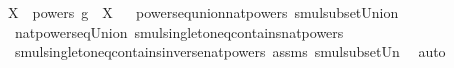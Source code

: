 \begin{isabellebody}
\ \ \ {\isachardoublequoteopen}X\ {\isasymcdots}\ {\isacharparenleft}{\kern0pt}powers\ g{\isacharparenright}{\kern0pt}\ {\isacharequal}{\kern0pt}\ X{\isachardoublequoteclose}%
\isadelimproof
\ %
\endisadelimproof
%
\isatagproof
{}\isamarkupfalse%
\ powers{\isacharunderscore}{\kern0pt}eq{\isacharunderscore}{\kern0pt}union{\isacharunderscore}{\kern0pt}nat{\isacharunderscore}{\kern0pt}powers\ smul{\isacharunderscore}{\kern0pt}subset{\isacharunderscore}{\kern0pt}Union{}\ \isanewline
\ \ \ \ nat{\isacharunderscore}{\kern0pt}powers{\isacharunderscore}{\kern0pt}eq{\isacharunderscore}{\kern0pt}Union\ smul{\isacharunderscore}{\kern0pt}singleton{\isacharunderscore}{\kern0pt}eq{\isacharunderscore}{\kern0pt}contains{\isacharunderscore}{\kern0pt}nat{\isacharunderscore}{\kern0pt}powers\ \isanewline
\ \ \ \ smul{\isacharunderscore}{\kern0pt}singleton{\isacharunderscore}{\kern0pt}eq{\isacharunderscore}{\kern0pt}contains{\isacharunderscore}{\kern0pt}inverse{\isacharunderscore}{\kern0pt}nat{\isacharunderscore}{\kern0pt}powers\ assms\ smul{\isacharunderscore}{\kern0pt}subset{\isacharunderscore}{\kern0pt}Un{}\ \isamarkupfalse%
\ auto%
\endisatagproof
{\isafoldproof}%
%
\isadelimproof
%
\endisadelimproof
\isanewline
\isanewline
{}\isamarkupfalse%
\isanewline
%
\isadelimtheory
\isanewline
%
\endisadelimtheory
%
\isatagtheory
{}\isamarkupfalse%
%
\endisatagtheory
{\isafoldtheory}%
%
\isadelimtheory
%
\endisadelimtheory
%
\end{isabellebody}%
\endinput
